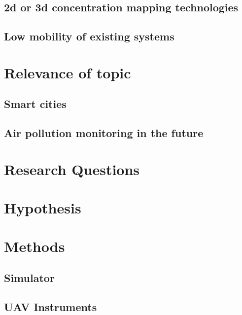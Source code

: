 \subsection{2d or 3d concentration mapping technologies}%
\label{sub:2d_or_3d_concentration_mapping_technologies}

\subsection{Low mobility of existing systems}%
\label{sub:low_mobility_of_existing_systems}

\section{Relevance of topic}%
\label{sec:relevance_of_topic}

\subsection{Smart cities}%
\label{sub:smart_cities}

\subsection{Air pollution monitoring in the future}%
\label{sub:air_pollution_monitoring_in_the_future}

\section{Research Questions}%
\label{sec:research_questions}

\section{Hypothesis}%
\label{sec:hypothesis}

\section{Methods}%
\label{sec:methods}

\subsection{Simulator}%
\label{sub:simulator}

\subsection{UAV Instruments}%
\label{sub:uav_instruments}

